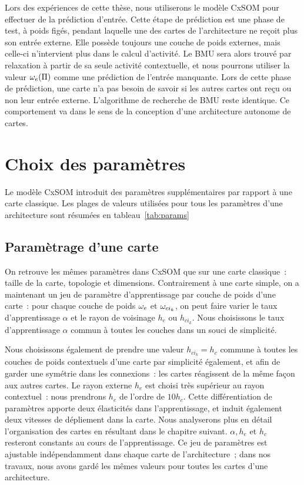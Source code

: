 \documentclass[../main]{subfiles}
\begin{document}
Lors des expériences de cette thèse, nous utiliserons le modèle CxSOM pour effectuer de la prédiction d'entrée. 
Cette étape de prédiction est une phase de test, à poids figés, pendant laquelle une des cartes de l'architecture ne reçoit plus son entrée externe. Elle possède toujours une couche de poids externes, mais celle-ci n'intervient plus dans le calcul d'activité.
Le BMU sera alors trouvé par relaxation à partir de sa seule activité contextuelle, et nous pourrons utiliser la valeur $\omega_e(\Pi)$ comme une prédiction de l'entrée manquante.
Lors de cette phase de prédiction, une carte n'a pas besoin de savoir si les autres cartes ont reçu ou non leur entrée externe. L'algorithme de recherche de BMU reste identique. Ce comportement va dans le sens de la conception d'une architecture autonome de cartes.

\section{Choix des paramètres}\label{sec:params}

Le modèle CxSOM introduit des paramètres supplémentaires par rapport à une carte classique. Les plages de valeurs utilisées pour tous les paramètres d'une architecture sont résumées en tableau~\ref{tab:params}

\subsection{Paramètrage d'une carte}
On retrouve les mêmes paramètres dans CxSOM que sur une carte classique~: taille de la carte, topologie et dimensions. 
Contrairement à une carte simple, on a maintenant un jeu de paramètre d'apprentissage par couche de poids d'une carte~: pour chaque couche de poids $\omega_e$ et $\omega_{ci_k}$, on peut faire varier le taux d'apprentissage $\alpha$ et le rayon de voisinage $h_e$ ou $h_{ci_k}$. 
Nous choisissons le taux d'apprentissage $\alpha$ commun à toutes les couches dans un souci de simplicité. 

Nous choisissons également de prendre une valeur $h_{ci_k} = h_c$ commune à toutes les couches de poids contextuels d'une carte par simplicité également, et afin de garder une symétrie dans les connexions~: les cartes réagissent de la même façon aux autres cartes.
Le rayon externe  $h_e$ est choisi très supérieur au rayon contextuel~: nous prendrons $h_e$ de l'ordre de $10 h_c$. Cette différentiation de paramètres apporte deux élasticités dans l'apprentissage, et induit également deux vitesses de dépliement dans la carte.
Nous analyserons plus en détail l'organisation des cartes en résultant dans le chapitre suivant.
$\alpha, h_e$ et $h_c$ resteront constants au cours de l'apprentissage.
Ce jeu de paramètres est ajustable indépendamment dans chaque carte de l'architecture~; dans nos travaux, nous avons gardé les mêmes valeurs pour toutes les cartes d'une architecture.
\end{document}

